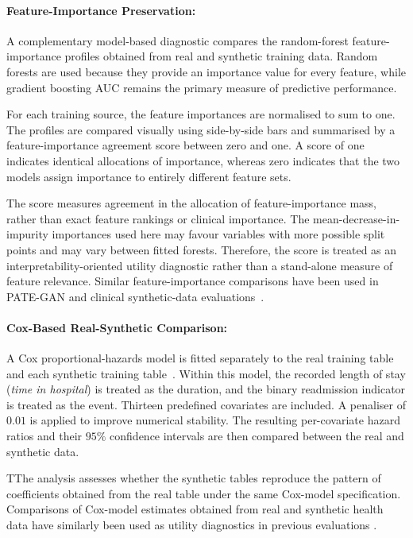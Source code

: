 \paragraph{Feature-Importance Preservation:}
\label{sec:eval:utility:predictive:fi}
A complementary model-based diagnostic compares the random-forest
feature-importance profiles obtained from real and synthetic training
data. Random forests are used because they provide an importance value
for every feature, while gradient boosting AUC remains the primary
measure of predictive performance.

For each training source, the feature importances are normalised to sum
to one. The profiles are compared visually using side-by-side bars and
summarised by a feature-importance agreement score between zero and one.
A score of one indicates identical allocations of importance, whereas
zero indicates that the two models assign importance to entirely
different feature sets.

The score measures agreement in the allocation of feature-importance
mass, rather than exact feature rankings or clinical importance. The
mean-decrease-in-impurity importances used here may favour variables
with more possible split points and may vary between fitted forests.
Therefore, the score is treated as an interpretability-oriented utility
diagnostic rather than a stand-alone measure of feature relevance.
Similar feature-importance comparisons have been used in PATE-GAN and
clinical synthetic-data evaluations~\cite{pategan,beaulieu2019privacy}.

\paragraph{Cox-Based Real-Synthetic Comparison:}
\label{sec:eval:utility:predictive:cox}
A Cox proportional-hazards model is fitted separately to the real
training table and each synthetic training table~\cite{Cox1972PH}.
Within this model, the recorded length of stay (\emph{time in hospital})
is treated as the duration, and the binary readmission indicator is
treated as the event. Thirteen predefined covariates are included. A
penaliser of $0.01$ is applied to improve numerical stability. 
The resulting per-covariate hazard ratios and their
$95\%$ confidence intervals are then compared between the real and
synthetic data.

TThe analysis assesses whether the synthetic tables reproduce the
pattern of coefficients obtained from the real table under the same
Cox-model specification. Comparisons of Cox-model
estimates obtained from real and synthetic health data have similarly
been used as utility diagnostics in previous evaluations
\cite{healthgan,yale2020synthesizing}.

